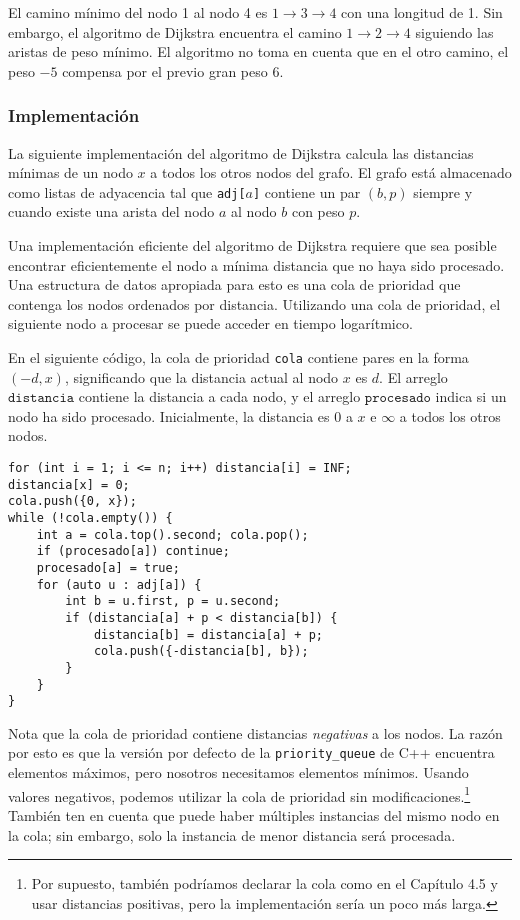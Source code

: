 El camino mínimo del nodo 1 al nodo 4 es $1 \rightarrow 3 \rightarrow 4$
con una longitud de 1. Sin embargo, el algoritmo de Dijkstra encuentra
el camino $1 \rightarrow 2 \rightarrow 4$ siguiendo las aristas de
peso mínimo. El algoritmo no toma en cuenta que en el otro camino, el
peso $-5$ compensa por el previo gran peso $6$.

\subsubsection{Implementación}

La siguiente implementación del algoritmo de Dijkstra calcula
las distancias mínimas de un nodo $x$ a todos los otros nodos del grafo.
El grafo está almacenado como listas de adyacencia tal que
\texttt{adj[$a$]} contiene un par $(b,p)$ siempre y cuando existe una
arista del nodo $a$ al nodo $b$ con peso $p$.

Una implementación eficiente del algoritmo de Dijkstra requiere
que sea posible encontrar eficientemente el nodo a mínima distancia
que no haya sido procesado. Una estructura de datos apropiada para
esto es una cola de prioridad que contenga los nodos ordenados
por distancia. Utilizando una cola de prioridad, el siguiente nodo
a procesar se puede acceder en tiempo logarítmico.

En el siguiente código, la cola de prioridad \texttt{cola} contiene
pares en la forma $(-d,x)$, significando que la distancia actual
al nodo $x$ es $d$. El arreglo $\texttt{distancia}$ contiene la distancia
a cada nodo, y el arreglo $\texttt{procesado}$ indica si un nodo ha sido
procesado. Inicialmente, la distancia es $0$ a $x$ e $\infty$ a
todos los otros nodos.

\begin{lstlisting}
for (int i = 1; i <= n; i++) distancia[i] = INF;
distancia[x] = 0;
cola.push({0, x});
while (!cola.empty()) {
    int a = cola.top().second; cola.pop();
    if (procesado[a]) continue;
    procesado[a] = true;
    for (auto u : adj[a]) {
        int b = u.first, p = u.second;
        if (distancia[a] + p < distancia[b]) {
            distancia[b] = distancia[a] + p;
            cola.push({-distancia[b], b});
        }
    }
}
\end{lstlisting}

Nota que la cola de prioridad contiene distancias \emph{negativas} a
los nodos. La razón por esto es que la versión por defecto de la
\texttt{priority\_queue} de C++ encuentra elementos máximos, pero
nosotros necesitamos elementos mínimos. Usando valores negativos,
podemos utilizar la cola de prioridad sin modificaciones.\footnote{Por
    supuesto, también podríamos declarar la cola como en el Capítulo 4.5
    y usar distancias positivas, pero la implementación sería un poco más
    larga.}
También ten en cuenta que puede haber múltiples instancias del mismo nodo
en la cola; sin embargo, solo la instancia de menor distancia será
procesada.

